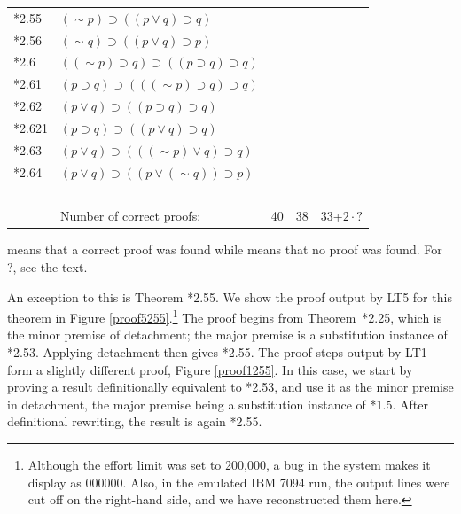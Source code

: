 \documentclass[journal]{IEEEtran}
\begin{document}
\begin{table}[h]
\begin{tabular}{lllll}
*2.55 & $ (\sim p) \supset ((p \vee q) \supset q) $ & \Y & \ & \Y \\
*2.56 & $ (\sim q) \supset ((p \vee q) \supset p) $ & \Y & \ & \N \\
*2.6 & $( (\sim p) \supset q) \supset ((p \supset q) \supset q) $ & \N & \ & \N \\
*2.61 & $(p \supset q) \supset (( (\sim p) \supset q) \supset q)$ & \Y & \ & \Y \\
*2.62 & $(p \vee q) \supset ((p \supset q) \supset q) $ & \Y & \ & \Y \\
*2.621 & $(p \supset q) \supset ((p \vee q) \supset q) $ & \Y & \ & \Y \\
*2.63 & $(p \vee q) \supset (( (\sim p) \vee q) \supset q) $ & \Y & \ & \Y \\
*2.64 & $(p \vee q) \supset ((p \vee (\sim q)) \supset p) $ & \N & \ & \N \\
\ & \ & \ & \ & \ \\
\ & Number of correct proofs: & 40 & 38 & 33+$2\cdot ?$ \\
\bottomrule
\end{tabular}
\begin{center} \Y{} means that a correct proof was found while \N{} means that no
proof was found.  For ?, see the text.
\end{center}
\end{table}

An exception to this is Theorem *2.55.  We show the proof output by LT5
for this theorem in Figure
\ref{proof5255}.\footnote{Although the effort limit was set to 200,000, a bug in the system makes it display as 000000.  Also, in the emulated IBM 7094 run, the output lines were cut off on the right-hand side, and we have reconstructed them here.}
The proof begins from Theorem~*2.25, which is the minor premise
of detachment; the major premise is a substitution instance of
*2.53.  Applying detachment then gives *2.55.  The proof steps
output by LT1 form a slightly different proof, Figure \ref{proof1255}.
In this case, we start by proving a result definitionally equivalent to *2.53, and
use it as the minor premise in detachment, the major premise being a substitution
instance of *1.5.  After definitional rewriting, the result is again *2.55.
\end{document}
